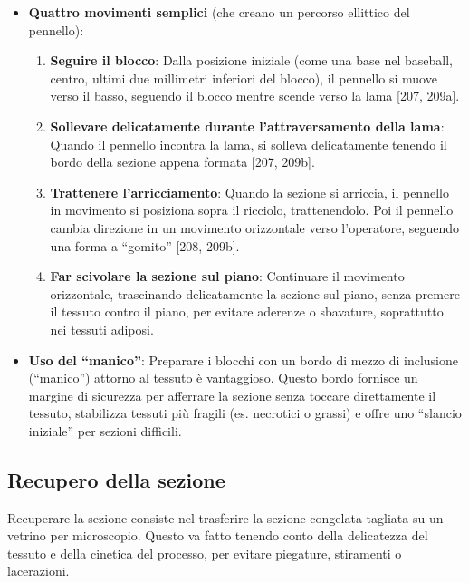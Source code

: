 \begin{itemize}
\item \textbf{Quattro movimenti semplici} (che creano un percorso ellittico del pennello):
\begin{enumerate}
\item \textbf{Seguire il blocco}: Dalla posizione iniziale (come una base nel baseball, centro, ultimi due millimetri inferiori del blocco), il pennello si muove verso il basso, seguendo il blocco mentre scende verso la lama [207, 209a].
\item \textbf{Sollevare delicatamente durante l'attraversamento della lama}: Quando il pennello incontra la lama, si solleva delicatamente tenendo il bordo della sezione appena formata [207, 209b].
\item \textbf{Trattenere l'arricciamento}: Quando la sezione si arriccia, il pennello in movimento si posiziona sopra il ricciolo, trattenendolo. Poi il pennello cambia direzione in un movimento orizzontale verso l'operatore, seguendo una forma a “gomito” [208, 209b].
\item \textbf{Far scivolare la sezione sul piano}: Continuare il movimento orizzontale, trascinando delicatamente la sezione sul piano, senza premere il tessuto contro il piano, per evitare aderenze o sbavature, soprattutto nei tessuti adiposi.
\end{enumerate}
\item \textbf{Uso del “manico”}: Preparare i blocchi con un bordo di mezzo di inclusione (“manico”) attorno al tessuto è vantaggioso. Questo bordo fornisce un margine di sicurezza per afferrare la sezione senza toccare direttamente il tessuto, stabilizza tessuti più fragili (es. necrotici o grassi) e offre uno “slancio iniziale” per sezioni difficili.
\end{itemize}

\subsection{Recupero della sezione}

Recuperare la sezione consiste nel trasferire la sezione congelata tagliata su un vetrino per microscopio. Questo va fatto tenendo conto della delicatezza del tessuto e della cinetica del processo, per evitare piegature, stiramenti o lacerazioni.


